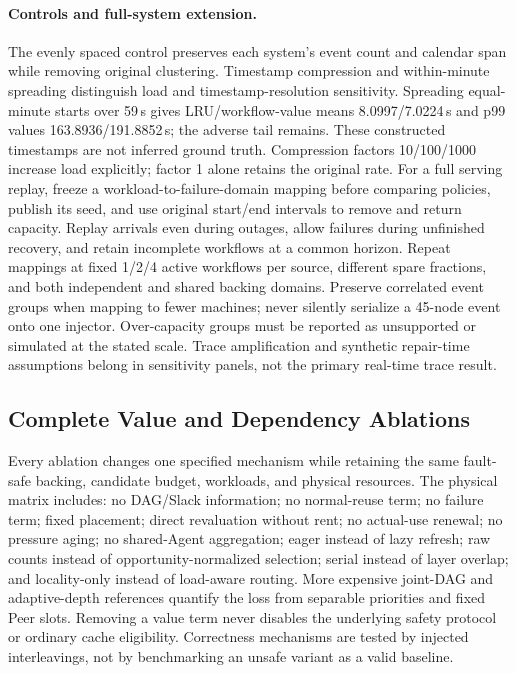\documentclass[sigplan,10pt,anonymous,nonacm]{acmart}
\begin{document}
\paragraph{Controls and full-system extension.}
The evenly spaced control preserves each system's event count and
calendar span while removing original clustering. Timestamp compression
and within-minute spreading distinguish load and timestamp-resolution
sensitivity. Spreading equal-minute starts over 59\,s gives LRU/workflow-value
means 8.0997/7.0224\,s and p99 values 163.8936/191.8852\,s; the adverse
tail remains. These constructed timestamps are not inferred ground truth.
Compression
factors 10/100/1000 increase load explicitly; factor 1 alone retains the
original rate. For a full serving replay, freeze a workload-to-failure-domain
mapping before comparing policies, publish its seed, and use original
start/end intervals to remove and return capacity. Replay arrivals even
during outages, allow failures during unfinished recovery, and retain
incomplete workflows at a common horizon. Repeat mappings at fixed
1/2/4 active workflows per source, different spare fractions, and both
independent and shared backing domains. Preserve correlated event groups
when mapping to fewer machines; never silently serialize a 45-node event
onto one injector. Over-capacity groups must be reported as unsupported
or simulated at the stated scale. Trace amplification and synthetic
repair-time assumptions belong in sensitivity panels, not the primary
real-time trace result.

\FloatBarrier
\subsection{Complete Value and Dependency Ablations}

Every ablation changes one specified mechanism while retaining the same
fault-safe backing, candidate budget, workloads, and physical resources.
The physical matrix includes: no DAG/Slack information; no normal-reuse
term; no failure term; fixed placement; direct revaluation without rent;
no actual-use renewal; no pressure aging; no shared-Agent aggregation;
eager instead of lazy refresh; raw counts instead of opportunity-normalized
selection; serial instead of layer overlap; and locality-only instead of
load-aware routing. More expensive joint-DAG and adaptive-depth references
quantify the loss from separable priorities and fixed Peer slots.
Removing a value term never
disables the underlying safety protocol or ordinary cache eligibility.
Correctness mechanisms are tested by injected interleavings, not by
benchmarking an unsafe variant as a valid baseline.
\end{document}
